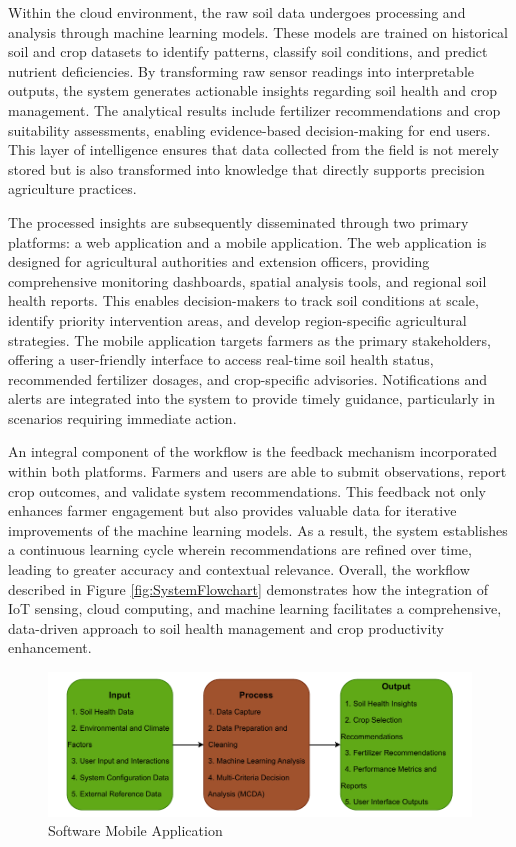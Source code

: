 {	Within the cloud environment, the raw soil data undergoes processing and analysis through machine learning models. These models are trained on historical soil and crop datasets to identify patterns, classify soil conditions, and predict nutrient deficiencies. By transforming raw sensor readings into interpretable outputs, the system generates actionable insights regarding soil health and crop management. The analytical results include fertilizer recommendations and crop suitability assessments, enabling evidence-based decision-making for end users. This layer of intelligence ensures that data collected from the field is not merely stored but is also transformed into knowledge that directly supports precision agriculture practices.
	
	The processed insights are subsequently disseminated through two primary platforms: a web application and a mobile application. The web application is designed for agricultural authorities and extension officers, providing comprehensive monitoring dashboards, spatial analysis tools, and regional soil health reports. This enables decision-makers to track soil conditions at scale, identify priority intervention areas, and develop region-specific agricultural strategies. The mobile application targets farmers as the primary stakeholders, offering a user-friendly interface to access real-time soil health status, recommended fertilizer dosages, and crop-specific advisories. Notifications and alerts are integrated into the system to provide timely guidance, particularly in scenarios requiring immediate action.
	
	An integral component of the workflow is the feedback mechanism incorporated within both platforms. Farmers and users are able to submit observations, report crop outcomes, and validate system recommendations. This feedback not only enhances farmer engagement but also provides valuable data for iterative improvements of the machine learning models. As a result, the system establishes a continuous learning cycle wherein recommendations are refined over time, leading to greater accuracy and contextual relevance. Overall, the workflow described in Figure \ref{fig:SystemFlowchart} demonstrates how the integration of IoT sensing, cloud computing, and machine learning facilitates a comprehensive, data-driven approach to soil health management and crop productivity enhancement.
	
	\begin{figure}[H]
		\centering
		\caption{Software Mobile Application}
		\label{fig:MobileFlowchart}
		\includegraphics[width=1\textwidth]{figures/IPO.pdf}
	\end{figure}
	
}
